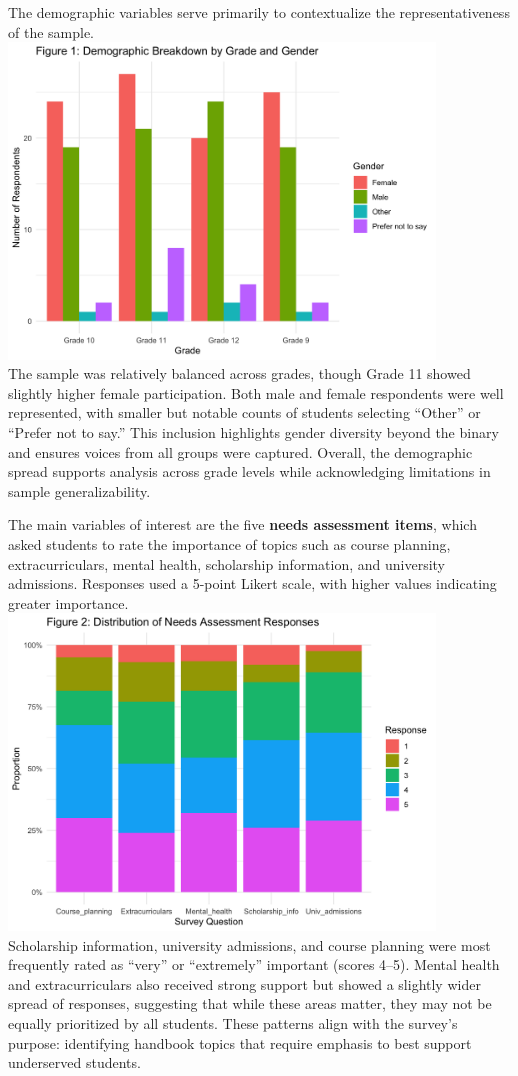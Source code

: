 \documentclass[
  letterpaper,
  DIV=11,
  numbers=noendperiod]{scrartcl}
\begin{document}
The demographic variables serve primarily to contextualize the
representativeness of the sample.\\
\includegraphics[width=0.85\textwidth,height=\textheight]{plot1.png}\\
The sample was relatively balanced across grades, though Grade 11 showed
slightly higher female participation. Both male and female respondents
were well represented, with smaller but notable counts of students
selecting ``Other'' or ``Prefer not to say.'' This inclusion highlights
gender diversity beyond the binary and ensures voices from all groups
were captured. Overall, the demographic spread supports analysis across
grade levels while acknowledging limitations in sample generalizability.

The main variables of interest are the five \textbf{needs assessment
items}, which asked students to rate the importance of topics such as
course planning, extracurriculars, mental health, scholarship
information, and university admissions. Responses used a 5-point Likert
scale, with higher values indicating greater importance.\\
\includegraphics[width=0.85\textwidth,height=\textheight]{plot2.png}\\
Scholarship information, university admissions, and course planning were
most frequently rated as ``very'' or ``extremely'' important (scores
4--5). Mental health and extracurriculars also received strong support
but showed a slightly wider spread of responses, suggesting that while
these areas matter, they may not be equally prioritized by all students.
These patterns align with the survey's purpose: identifying handbook
topics that require emphasis to best support underserved students.
\end{document}
